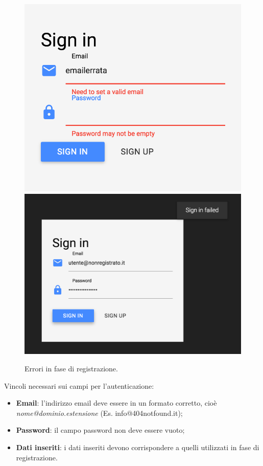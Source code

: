 \begin{figure}[!h]
\begin{center}
\includegraphics[scale=0.4]{img/signin_error.png}%
\qquad\qquad
\includegraphics[scale=0.3]{img/signin_error2.png}
\caption{Errori in fase di registrazione.}
\end{center}
\end{figure}

Vincoli necessari sui campi per l'autenticazione:
\begin{itemize}
\item \textbf{Email}: l'indirizzo email deve essere in un formato corretto, cioè \emph{nome@dominio.estensione} (Es. info@404notfound.it);
\item \textbf{Password}: il campo password non deve essere vuoto;
\item \textbf{Dati inseriti}: i dati inseriti devono corrispondere a quelli utilizzati in fase di registrazione.
\end{itemize}

